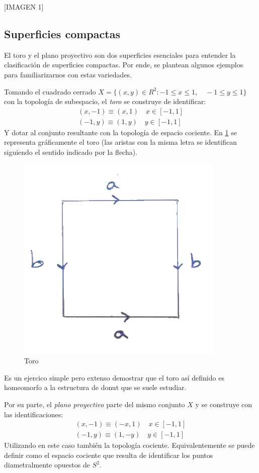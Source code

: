 \documentclass[a4paper,11pt,spanish, twoside, leqno]{tfg-uam}
\theoremstyle{definition}
\begin{document}
[IMAGEN 1]


\subsection{Superficies compactas}

El toro y el plano proyectivo son dos superficies esenciales para entender la clasificación de superficies compactas. Por ende, se plantean algunos ejemplos para familiarizarnos con estas variedades.

Tomando el cuadrado cerrado $ X = \{ (x,y) \in R^2: -1\leq x\leq 1,\quad -1\leq y \leq 1  \} $ con la topología de subespacio, el \textit{toro}  se construye de identificar:
\begin{align*}
(x,-1)\equiv(x,1) \quad x\in [-1,1]\\
(-1,y)\equiv(1,y) \quad y\in [-1,1] 
\end{align*}
Y dotar al conjunto resultante con la topología de espacio cociente. En \ref{fig:toro} se representa gráficamente el toro (las aristas con la misma letra se identifican siguiendo el sentido indicado por la flecha).

\begin{figure}[h]\label{fig:toro}
	\centering
	\includegraphics[width=0.3\linewidth]{imagenes/toro.png}
	\caption{Toro}
\end{figure} 

Es un ejercico simple pero extenso  demostrar que  el toro así definido es homeomorfo a la estructura de donut que se suele estudiar.

Por su parte, el \textit{plano proyectivo} parte del mismo conjunto $X$ y se construye con las identificaciones:
\begin{align*}
(x,-1)\equiv(-x,1) \quad x\in [-1,1]\\
(-1,y)\equiv(1,-y) \quad y\in [-1,1] 
\end{align*}
Utilizando en este caso también la topología cociente. Equivalentemente se puede definir como el espacio cociente que resulta de identificar los puntos diametralmente opuestos de $S^2$.
\end{document}
